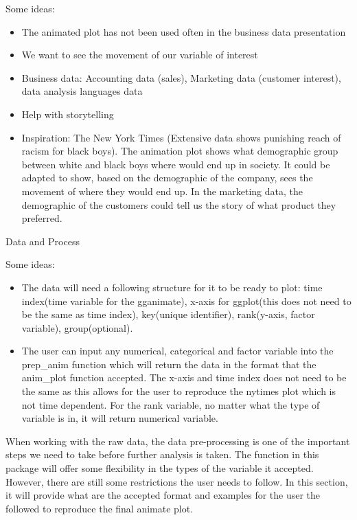 Some ideas:

\begin{itemize}
\tightlist
\item
  The animated plot has not been used often in the business data presentation
\item
  We want to see the movement of our variable of interest
\item
  Business data: Accounting data (sales), Marketing data (customer interest), data analysis languages data
\item
  Help with storytelling
\item
  Inspiration: The New York Times (Extensive data shows punishing reach of racism for black boys). The animation plot shows what demographic group between white and black boys where would end up in society. It could be adapted to show, based on the demographic of the company, sees the movement of where they would end up. In the marketing data, the demographic of the customers could tell us the story of what product they preferred.
\end{itemize}

Data and Process

Some ideas:

\begin{itemize}
\item
  The data will need a following structure for it to be ready to plot: time index(time variable for the gganimate), x-axis for ggplot(this does not need to be the same as time index), key(unique identifier), rank(y-axis, factor variable), group(optional).
\item
  The user can input any numerical, categorical and factor variable into the prep\_anim function which will return the data in the format that the anim\_plot function accepted. The x-axis and time index does not need to be the same as this allows for the user to reproduce the nytimes plot which is not time dependent. For the rank variable, no matter what the type of variable is in, it will return numerical variable.
\end{itemize}

When working with the raw data, the data pre-processing is one of the important steps we need to take before further analysis is taken. The function in this package will offer some flexibility in the types of the variable it accepted. However, there are still some restrictions the user needs to follow. In this section, it will provide what are the accepted format and examples for the user the followed to reproduce the final animate plot.

